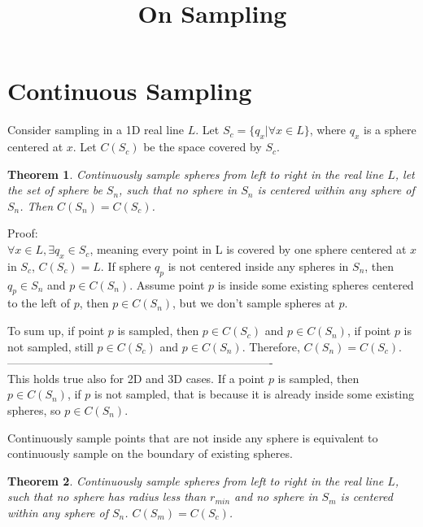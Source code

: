 \documentclass[12pt]{article}
\title{On Sampling}
\date{}
\newtheorem{theorem}{Theorem}[section]
\begin{document}
  \maketitle
  
  \section{Continuous Sampling}
  Consider sampling in a 1D real line $L$. Let $S_{c} = \{q_{x} | \forall x \in L\}$, where $q_{x}$ is a sphere centered at $x$. Let $C(S_{c})$ be the space covered by $S_{c}$.
  
  \begin{theorem}
  Continuously sample spheres from left to right in the real line $L$, let the set of sphere be $S_{n}$, such that no sphere in $S_{n}$ is centered within any sphere of $S_{n}$. Then $C(S_{n}) = C(S_{c})$.
  \end{theorem}
  
  Proof:\\
  
  $\forall x \in L, \exists q_{x} \in S_{c}$, meaning every point in L is covered by one sphere centered at $x$ in $S_{c}$, $C(S_{c}) = L$. If sphere $q_{p}$ is not centered inside any spheres in $S_{n}$, then $q_{p} \in S_{n}$ and $p \in C(S_{n})$. Assume point $p$ is inside some existing spheres centered to the left of $p$, then $p \in C(S_{n})$, but we don't sample spheres at $p$. 
  
  To sum up, if point $p$ is sampled, then $p \in C(S_{c})$ and $p \in C(S_{n})$, if point $p$ is not sampled, still $p \in C(S_{c})$ and $p \in C(S_{n})$. Therefore, $C(S_{n}) = C(S_{c})$.\\
  
  ---------------------------------------------------------------------- \\
  
  This holds true also for 2D and 3D cases. If a point $p$ is sampled, then $p \in C(S_{n})$, if $p$ is not sampled, that is because it is already inside some existing spheres, so $p \in C(S_{n})$.
  
  Continuously sample points that are not inside any sphere is equivalent to continuously sample on the boundary of existing spheres.
  
  \begin{theorem}
  Continuously sample spheres from left to right in the real line $L$, such that no sphere has radius less than $r_{min}$ and no sphere in $S_{m}$ is centered within any sphere of $S_{n}$. $C(S_{m}) = C(S_{c})$.
  \end{theorem}
\end{document}
